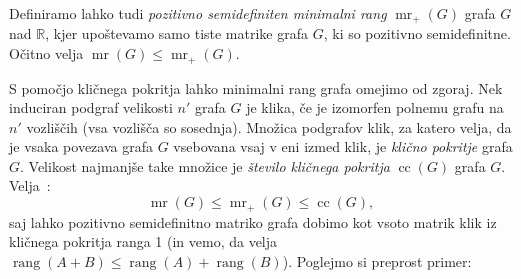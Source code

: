 \documentclass[12pt,a4paper,twoside]{article}
\theoremstyle{definition} %
\theoremstyle{plain} %
\numberwithin{equation}{section}  %
\newcommand{\R}{\mathbb R}
\DeclareMathOperator{\mr}{mr}
\DeclareMathOperator{\rang}{rang}
\DeclareMathOperator{\cc}{cc}
\begin{document}
Definiramo lahko tudi \emph{pozitivno semidefiniten minimalni rang} $\mr_+(G)$ grafa $G$ nad $\R$, kjer upoštevamo samo tiste matrike grafa $G$, ki so pozitivno semidefinitne. Očitno velja $\mr(G) \leq \mr_+(G)$.

S pomočjo kličnega pokritja lahko minimalni rang grafa omejimo od zgoraj. Nek induciran podgraf velikosti $n'$ grafa $G$ je klika, če je izomorfen polnemu grafu na $n'$ vozliščih (vsa vozlišča so sosednja). Množica podgrafov klik, za katero velja, da je vsaka povezava grafa $G$ vsebovana vsaj v eni izmed klik, je \emph{klično pokritje} grafa $G$. Velikost najmanjše take množice je \emph{število kličnega pokritja} $\cc(G)$ grafa $G$. Velja~\cite{booth2008minimum}:
\begin{equation}
\label{eq:mr-cc}
\mr(G) \leq \mr_+(G) \leq \cc(G),
\end{equation}
saj lahko pozitivno semidefinitno matriko grafa dobimo kot vsoto matrik klik iz kličnega pokritja ranga 1 (in vemo, da velja $\rang(A+B) \leq \rang(A) + \rang(B)$). Poglejmo si preprost primer:
\end{document}
